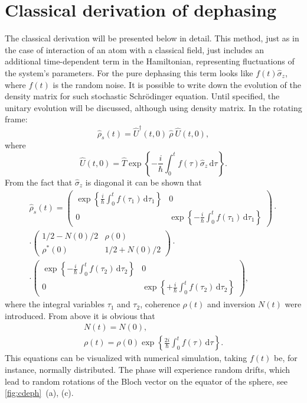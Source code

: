 \documentclass[12pt, twoside]{report}
\newcommand{\diff}{\,\mathrm{d}}
\newcommand{\rbrkt}[1]{\left( #1 \right)}
\numberwithin{equation}{section}
\begin{document}
\section{Classical derivation of dephasing}

The classical derivation will be presented below in detail. This method, just as in the case of interaction of an atom with a classical field, just includes an additional time-dependent term in the Hamiltonian, representing fluctuations of the system's parameters. For the pure dephasing this term looks like $f(t) \hat \sigma_z$, where $f(t)$ is the random noise. It is possible to write down the evolution of the density matrix for such stochastic Schrödinger equation. Until specified, the unitary evolution will be discussed, although using density matrix. In the rotating frame:
\[
\hat \rho_s (t) = \hat U^\dag(t, 0)\ \hat\rho\ \hat U(t, 0), 
\]
where 
\[
\hat U(t, 0) = \hat T \exp \left\{-\frac{i}{\hbar} \int_0^t f(\tau)\hat \sigma_z \diff\tau\right\}.
\]
From the fact that $\hat \sigma_z$ is diagonal it can be shown that
\[
\begin{gathered}
\hat \rho_s (t) = \rbrkt{\begin{matrix}
\exp \left\{\frac{i}{\hbar} \int_0^t f(\tau_1) \diff\tau_1\right\} & 0\\
0 & \exp \left\{-\frac{i}{\hbar} \int_0^t f(\tau_1) \diff\tau_1\right\}
\end{matrix}}\cdot\\
\cdot\rbrkt{\begin{matrix}
1/2 - N(0)/2 & \rho(0) \\
\rho^*(0) & 1/2 + N(0)/2 
\end{matrix}}\cdot\\
\cdot\rbrkt{\begin{matrix}
\exp \left\{-\frac{i}{\hbar} \int_0^t f(\tau_2)\diff\tau_2\right\} & 0\\
0 & \exp \left\{+\frac{i}{\hbar} \int_0^t f(\tau_2)\diff\tau_2\right\}
\end{matrix}},
\end{gathered}
\] 
where the integral variables $\tau_1$ and $\tau_2$, coherence $\rho(t)$ and inversion $N(t)$ were introduced. From above it is obvious that
\begin{gather}
N(t) = N(0),\\
\rho(t) = \rho(0)\exp \left\{ \frac{2i}{\hbar}\int_0^t f(\tau)  \diff \tau \right\}. \label{eq:rho_t}
\end{gather}
This equations can be visualized with numerical simulation, taking $f(t)$ be, for instance, normally distributed. The phase will experience random drifts, which lead to random rotations of the Bloch vector on the equator of the sphere, see \autoref{fig:cdeph}~(a), (c).
\end{document}
